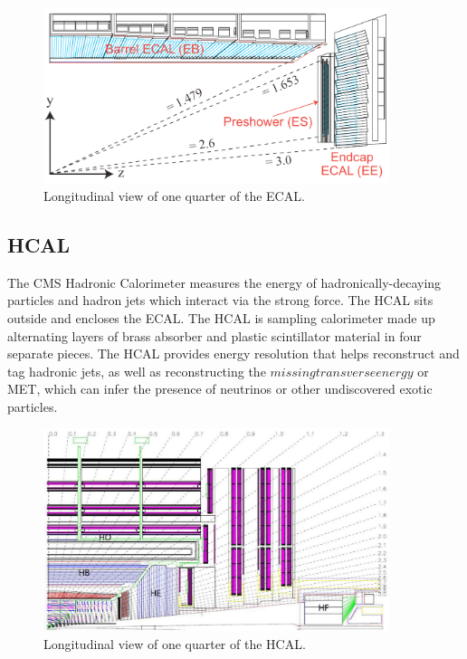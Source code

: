 \begin{figure}[hbtp]
 \begin{center}
   \includegraphics[width=0.9\textwidth]{ch3_figs/ecal_rapidity.pdf}
   \caption{Longitudinal view of one quarter of the ECAL.}
   \label{fig:cms_ecal}
 \end{center}
\end{figure}

\subsection{HCAL}
The CMS Hadronic Calorimeter measures the energy of hadronically-decaying particles and hadron jets which interact via the strong force. The HCAL sits outside and encloses the ECAL.
The HCAL is sampling calorimeter made up alternating layers of brass absorber and plastic scintillator material in four separate pieces. The HCAL provides energy resolution that helps reconstruct and tag hadronic
jets, as well as reconstructing the $missing transverse energy$ or MET, which can infer the presence of neutrinos or other undiscovered exotic particles. 

\begin{figure}[hbtp]
 \begin{center}
   \includegraphics[width=0.9\textwidth]{ch3_figs/hcal.pdf}
   \caption{Longitudinal view of one quarter of the HCAL.}
   \label{fig:cms_hcal}
 \end{center}
\end{figure}

